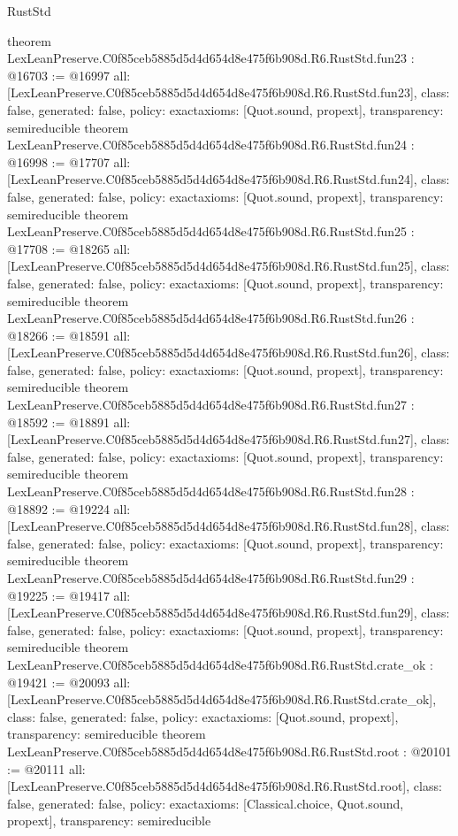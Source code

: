 \begin{lexlean}{RustStd}
\begin{coremodule}
{}
theorem LexLeanPreserve.C0f85ceb5885d5d4d654d8e475f6b908d.R6.RustStd.fun23 : @16703 := @16997 {
  all: [LexLeanPreserve.C0f85ceb5885d5d4d654d8e475f6b908d.R6.RustStd.fun23],
  class: false,
  generated: false,
  policy: exact{axioms: [Quot.sound, propext]},
  transparency: semireducible
}
theorem LexLeanPreserve.C0f85ceb5885d5d4d654d8e475f6b908d.R6.RustStd.fun24 : @16998 := @17707 {
  all: [LexLeanPreserve.C0f85ceb5885d5d4d654d8e475f6b908d.R6.RustStd.fun24],
  class: false,
  generated: false,
  policy: exact{axioms: [Quot.sound, propext]},
  transparency: semireducible
}
theorem LexLeanPreserve.C0f85ceb5885d5d4d654d8e475f6b908d.R6.RustStd.fun25 : @17708 := @18265 {
  all: [LexLeanPreserve.C0f85ceb5885d5d4d654d8e475f6b908d.R6.RustStd.fun25],
  class: false,
  generated: false,
  policy: exact{axioms: [Quot.sound, propext]},
  transparency: semireducible
}
theorem LexLeanPreserve.C0f85ceb5885d5d4d654d8e475f6b908d.R6.RustStd.fun26 : @18266 := @18591 {
  all: [LexLeanPreserve.C0f85ceb5885d5d4d654d8e475f6b908d.R6.RustStd.fun26],
  class: false,
  generated: false,
  policy: exact{axioms: [Quot.sound, propext]},
  transparency: semireducible
}
theorem LexLeanPreserve.C0f85ceb5885d5d4d654d8e475f6b908d.R6.RustStd.fun27 : @18592 := @18891 {
  all: [LexLeanPreserve.C0f85ceb5885d5d4d654d8e475f6b908d.R6.RustStd.fun27],
  class: false,
  generated: false,
  policy: exact{axioms: [Quot.sound, propext]},
  transparency: semireducible
}
theorem LexLeanPreserve.C0f85ceb5885d5d4d654d8e475f6b908d.R6.RustStd.fun28 : @18892 := @19224 {
  all: [LexLeanPreserve.C0f85ceb5885d5d4d654d8e475f6b908d.R6.RustStd.fun28],
  class: false,
  generated: false,
  policy: exact{axioms: [Quot.sound, propext]},
  transparency: semireducible
}
theorem LexLeanPreserve.C0f85ceb5885d5d4d654d8e475f6b908d.R6.RustStd.fun29 : @19225 := @19417 {
  all: [LexLeanPreserve.C0f85ceb5885d5d4d654d8e475f6b908d.R6.RustStd.fun29],
  class: false,
  generated: false,
  policy: exact{axioms: [Quot.sound, propext]},
  transparency: semireducible
}
theorem LexLeanPreserve.C0f85ceb5885d5d4d654d8e475f6b908d.R6.RustStd.crate_ok : @19421 := @20093 {
  all: [LexLeanPreserve.C0f85ceb5885d5d4d654d8e475f6b908d.R6.RustStd.crate_ok],
  class: false,
  generated: false,
  policy: exact{axioms: [Quot.sound, propext]},
  transparency: semireducible
}
theorem LexLeanPreserve.C0f85ceb5885d5d4d654d8e475f6b908d.R6.RustStd.root : @20101 := @20111 {
  all: [LexLeanPreserve.C0f85ceb5885d5d4d654d8e475f6b908d.R6.RustStd.root],
  class: false,
  generated: false,
  policy: exact{axioms: [Classical.choice, Quot.sound, propext]},
  transparency: semireducible
}


\end{coremodule}
\end{lexlean}
